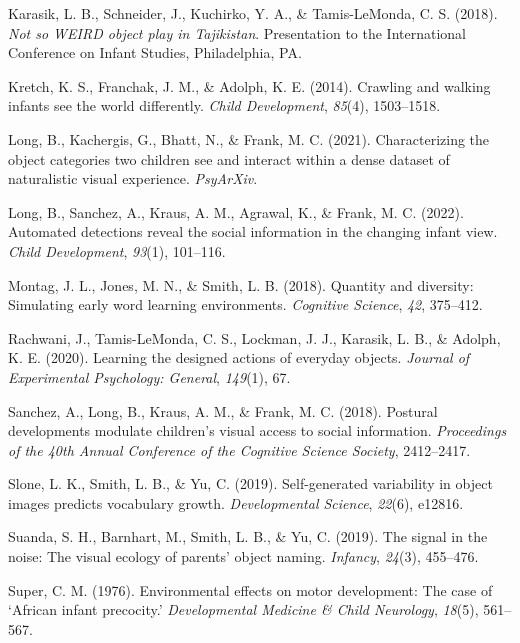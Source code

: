 \documentclass[10pt, letterpaper]{article}
\newenvironment{CSLReferences}%
  {}%
  {\par}
\begin{document}
\begin{CSLReferences}
\leavevmode\hypertarget{ref-karasik2018not}{}%
Karasik, L. B., Schneider, J., Kuchirko, Y. A., \& Tamis-LeMonda, C. S.
(2018). \emph{Not so {WEIRD} object play in {T}ajikistan}. {Presentation
to the International Conference on Infant Studies, Philadelphia, PA}.

\leavevmode\hypertarget{ref-kretch2014crawling}{}%
Kretch, K. S., Franchak, J. M., \& Adolph, K. E. (2014). Crawling and
walking infants see the world differently. \emph{Child Development},
\emph{85}(4), 1503--1518.

\leavevmode\hypertarget{ref-long2021characterizing}{}%
Long, B., Kachergis, G., Bhatt, N., \& Frank, M. C. (2021).
Characterizing the object categories two children see and interact
within a dense dataset of naturalistic visual experience.
\emph{PsyArXiv}.

\leavevmode\hypertarget{ref-long2022automated}{}%
Long, B., Sanchez, A., Kraus, A. M., Agrawal, K., \& Frank, M. C.
(2022). Automated detections reveal the social information in the
changing infant view. \emph{Child Development}, \emph{93}(1), 101--116.

\leavevmode\hypertarget{ref-montag2018quantity}{}%
Montag, J. L., Jones, M. N., \& Smith, L. B. (2018). Quantity and
diversity: Simulating early word learning environments. \emph{Cognitive
Science}, \emph{42}, 375--412.

\leavevmode\hypertarget{ref-rachwani2020learning}{}%
Rachwani, J., Tamis-LeMonda, C. S., Lockman, J. J., Karasik, L. B., \&
Adolph, K. E. (2020). Learning the designed actions of everyday objects.
\emph{Journal of Experimental Psychology: General}, \emph{149}(1), 67.

\leavevmode\hypertarget{ref-sanchez2018detecting}{}%
Sanchez, A., Long, B., Kraus, A. M., \& Frank, M. C. (2018). Postural
developments modulate children's visual access to social information.
\emph{{Proceedings of the 40th Annual Conference of the Cognitive
Science Society}}, 2412--2417.

\leavevmode\hypertarget{ref-slone2019self}{}%
Slone, L. K., Smith, L. B., \& Yu, C. (2019). Self-generated variability
in object images predicts vocabulary growth. \emph{Developmental
Science}, \emph{22}(6), e12816.

\leavevmode\hypertarget{ref-suanda2019signal}{}%
Suanda, S. H., Barnhart, M., Smith, L. B., \& Yu, C. (2019). The signal
in the noise: The visual ecology of parents' object naming.
\emph{Infancy}, \emph{24}(3), 455--476.

\leavevmode\hypertarget{ref-super1976environmental}{}%
Super, C. M. (1976). Environmental effects on motor development: The
case of {`{A}frican infant precocity.'} \emph{Developmental Medicine \&
Child Neurology}, \emph{18}(5), 561--567.


\end{CSLReferences}
\end{document}
